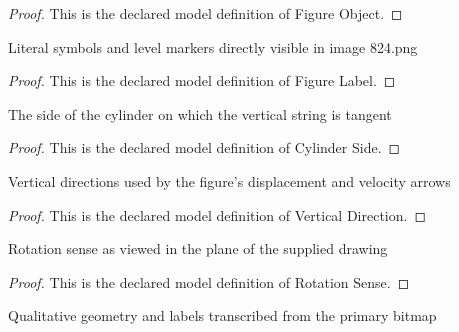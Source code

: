 \begin{proof}
  This is the declared model definition of Figure Object.
\end{proof}
\begin{definition}
  \label{def:physics:phyx-mini-0824:phyxminiproblems-problemphyxmini0824-figurelabel}
  Literal symbols and level markers directly visible in image 824.png
\end{definition}
\begin{proof}
  This is the declared model definition of Figure Label.
\end{proof}
\begin{definition}
  \label{def:physics:phyx-mini-0824:phyxminiproblems-problemphyxmini0824-cylinderside}
  The side of the cylinder on which the vertical string is tangent
\end{definition}
\begin{proof}
  This is the declared model definition of Cylinder Side.
\end{proof}
\begin{definition}
  \label{def:physics:phyx-mini-0824:phyxminiproblems-problemphyxmini0824-verticaldirection}
  Vertical directions used by the figure's displacement and velocity arrows
\end{definition}
\begin{proof}
  This is the declared model definition of Vertical Direction.
\end{proof}
\begin{definition}
  \label{def:physics:phyx-mini-0824:phyxminiproblems-problemphyxmini0824-rotationsense}
  Rotation sense as viewed in the plane of the supplied drawing
\end{definition}
\begin{proof}
  This is the declared model definition of Rotation Sense.
\end{proof}
\begin{definition}
  \label{def:physics:phyx-mini-0824:phyxminiproblems-problemphyxmini0824-suppliedyoyofigure}
  Qualitative geometry and labels transcribed from the primary bitmap
\end{definition}
